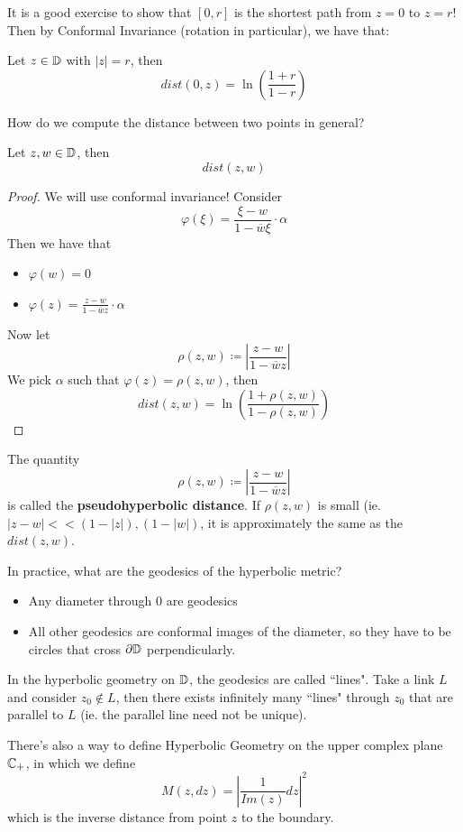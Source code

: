 It is a good exercise to show that $[0, r]$ is the shortest path from $z = 0$ to $z = r$! Then by Conformal Invariance (rotation in particular), we have that:

\begin{proposition}
    Let $z \in \mathbb{D}$ with $|z| = r$, then
    \[dist(0, z) = \ln(\frac{1 + r}{1 - r})\]
\end{proposition}

How do we compute the distance between two points in general?

\begin{proposition}
    Let $z, w \in \mathbb{D}$, then
    \[dist(z, w)\]
\end{proposition}

\begin{proof}
    We will use conformal invariance! Consider
    \[\varphi(\xi) = \frac{\xi - w}{1 - \overline{w} \xi} \cdot \alpha\]
    Then we have that
    \begin{itemize}
        \item $\varphi(w) = 0$
        \item $\varphi(z) = \frac{z - w}{1 - \overline{w} z} \cdot \alpha$
    \end{itemize}
    Now let
    \[\rho(z, w) \coloneqq |\frac{z - w}{1 - \overline{w} z}|\]
    We pick $\alpha$ such that $\varphi(z) = \rho(z, w)$, then 
    \[dist(z, w) = \ln(\frac{1 + \rho(z, w)}{1 - \rho(z, w)})\]
\end{proof}

\begin{definition}
    The quantity
    \[\rho(z, w) \coloneqq |\frac{z - w}{1 - \overline{w} z}|\]
    is called the \textbf{pseudohyperbolic distance}. If $\rho(z, w)$ is small (ie. $|z - w| << (1 - |z|), (1 - |w|)$, it is approximately the same as the $dist(z, w)$.
\end{definition}

In practice, what are the geodesics of the hyperbolic metric?
\begin{itemize}
    \item Any diameter through $0$ are geodesics
    \item All other geodesics are conformal images of the diameter, so they have to be circles that cross $\partial \mathbb{D}$ perpendicularly.
\end{itemize}

\begin{remark}
    In the hyperbolic geometry on $\mathbb{D}$, the geodesics are called ``lines". Take a link $L$ and consider $z_0 \notin L$, then there exists infinitely many ``lines" through $z_0$ that are parallel to $L$ (ie. the parallel line need not be unique).
\end{remark}

There's also a way to define Hyperbolic Geometry on the upper complex plane $\mathbb{C}_+$, in which we define
\[M(z, dz) = |\frac{1}{Im(z)} dz|^2 \]
which is the inverse distance from point $z$ to the boundary.